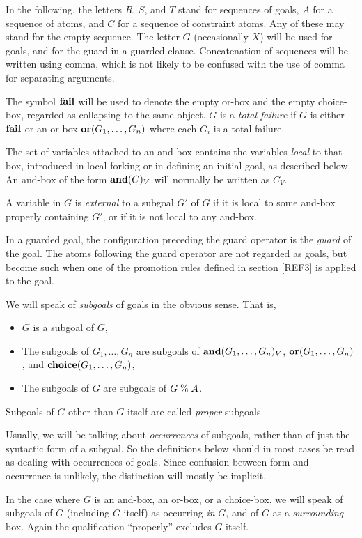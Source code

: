 In the following, the letters $R$, $S$, and $T$ stand for sequences of
goals, $A$ for a sequence of atoms, and $C$ for a sequence of
constraint atoms. Any of these may stand for the empty sequence. The
letter $G$ (occasionally $X$) will be used for goals, and for the
guard in a guarded clause.  Concatenation of sequences will be written
using comma, which is not likely to be confused with the use of comma
for separating arguments.

The symbol $\mbox{\bf fail}$ will be used to denote the empty or-box and the
empty choice-box, regarded as collapsing to the same object. $G$ is a
{\em total failure} if $G$ is either $\mbox{\bf fail}$ or an or-box
$\mbox{\bf or}(G_1,\dots,G_n)$ where each $G_i$ is a total failure.

The set of variables attached to an and-box contains the variables
{\em local} to that box, introduced in local forking or in defining an
initial goal, as described below. An and-box of the form $\mbox{\bf and}(C)_V$
will normally be written as $C_V$.

A variable in $G$ is {\em external} to a subgoal $G'$ of $G$ if it is
local to some and-box properly containing $G'$, or if it is not local
to any and-box.

In a guarded goal, the configuration preceding the guard operator is
the {\em guard} of the goal. The atoms following the guard operator
are not regarded as goals, but become such when one of the promotion
rules defined in section \ref{REF3} is applied to the goal.

We will speak of {\em subgoals} of goals in the obvious sense. That is,
%
\begin{itemize}
\item $G$ is a subgoal of $G$,
\item The subgoals of $G_1,\dots,G_n$ are subgoals of
$\mbox{\bf and}(G_1,\dots,G_n)_V$, $\mbox{\bf or}(G_1,\dots,G_n)$, and
$\mbox{\bf choice}(G_1,\dots,G_n)$,
\item The subgoals of $G$ are subgoals of $G \mathrel{\mbox{\%}} A$.
\end{itemize}
%
Subgoals of $G$ other than $G$ itself are called {\em proper} subgoals.

Usually, we will be talking about {\em occurrences} of subgoals,
rather than of just the syntactic form of a subgoal. So the
definitions below should in most cases be read as dealing with
occurrences of goals.  Since confusion between form and occurrence is
unlikely, the distinction will mostly be implicit.

In the case where $G$ is an and-box, an or-box, or a choice-box, we
will speak of subgoals of $G$ (including $G$ itself) as occurring {\em
in} $G$, and of $G$ as a {\em surrounding} box.  Again the
qualification ``properly'' excludes $G$ itself.

